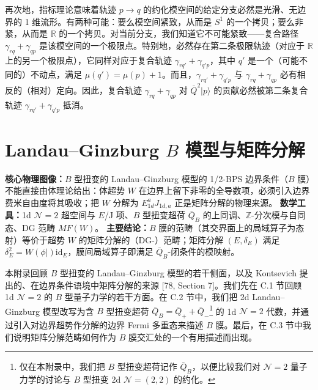 再次地，指标理论意味着轨迹 $p\to q$ 的约化模空间的给定分支必然是光滑、无边界的 1 维流形。有两种可能：要么模空间紧致，从而是 $S^1$ 的一个拷贝；要么非紧，从而是 $\mathbb{R}$ 的一个拷贝。对当前分支，我们知道它不可能紧致——复合路径 $\gamma_{rq}+\gamma_{qp}$ 是该模空间的一个极限点。特别地，必然存在第二条极限轨迹（对应于 $\mathbb{R}$ 上的另一个极限点），它同样对应于复合轨迹 $\gamma_{rq'}+\gamma_{q'p}$，其中 $q'$ 是一个（可能不同的）不动点，满足 $\mu(q')=\mu(p)+1$。而且，$\gamma_{rq'}+\gamma_{q'p}$ 与 $\gamma_{rq}+\gamma_{qp}$ 必有相反的（相对）定向。因此，复合轨迹 $\gamma_{rq}+\gamma_{qp}$ 对 $\bar Q^2|p\rangle$ 的贡献必然被第二条复合轨迹 $\gamma_{rq'}+\gamma_{q'p}$ 抵消。

\section{Landau–Ginzburg $B$ 模型与矩阵分解}
\begin{keytakeaway}
\textbf{核心物理图像：}$B$ 型扭变的 Landau–Ginzburg 模型的 1/2-BPS 边界条件（$B$ 膜）不能直接由体理论给出：体超势 $W$ 在边界上留下非零的全导数项，必须引入边界费米自由度将其吸收；把 $W$ 分解为 $E^a_{1d}J_{1d,a}$ 正是矩阵分解的物理来源。
\textbf{数学工具：}1d $\mathcal{N}=2$ 超空间与 $E$/J 项、$B$ 型扭变超荷 $\bar Q_B$ 的上同调、$\mathbb{Z}$-分次模与自同态、DG 范畴 $MF(W)$。
\textbf{主要结论：}$B$ 膜的范畴（其交界面上的局域算子为态射）等价于超势 $W$ 的矩阵分解的（DG-）范畴；矩阵分解 $(E,\delta_E)$ 满足 $\delta_E^2=W(\phi|)\mathrm{id}_E$，膜间局域算子即满足 $\bar Q_B$-闭条件的模映射。
\end{keytakeaway}

本附录回顾 $B$ 型扭变的 Landau–Ginzburg 模型的若干侧面，以及 Kontsevich 提出的、在边界条件语境中矩阵分解的来源 [78, Section 7]。我们先在 C.1 节回顾 1d $\mathcal{N}=2$ 的 $B$ 型量子力学的若干方面。在 C.2 节中，我们把 2d Landau–Ginzburg 模型改写为含 $B$ 型扭变超荷 $\bar Q_B=\bar Q_++\bar Q_-$\footnote{仅在本附录中，我们把 $B$ 型扭变超荷记作 $\bar Q_B$，以便比较我们对 $\mathcal{N}=2$ 量子力学的讨论与 $B$ 型扭变 2d $\mathcal{N}=(2,2)$ 的约化。} 的 1d $\mathcal{N}=2$ 代数，并通过引入对边界超势作分解的边界 Fermi 多重态来描述 $B$ 膜。最后，在 C.3 节中我们说明矩阵分解范畴如何作为 $B$ 膜交汇处的一个有用描述而出现。

